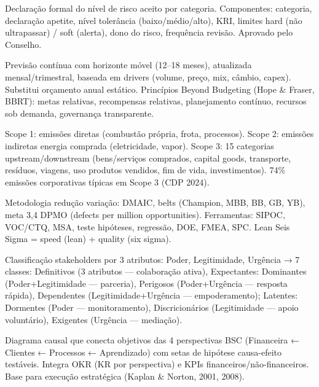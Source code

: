 \begin{ecglossario}
\item[\textbf{Risk Appetite Statement (RAS)}] Declaração formal do nível de risco aceito por categoria. Componentes: categoria, declaração apetite, nível tolerância (baixo/médio/alto), KRI, limites hard (não ultrapassar) / soft (alerta), dono do risco, frequência revisão. Aprovado pelo Conselho.

\item[\textbf{Rolling Forecast}] Previsão contínua com horizonte móvel (12–18 meses), atualizada mensal/trimestral, baseada em drivers (volume, preço, mix, câmbio, capex). Substitui orçamento anual estático. Princípios Beyond Budgeting (Hope \& Fraser, BBRT): metas relativas, recompensas relativas, planejamento contínuo, recursos sob demanda, governança transparente.

\item[\textbf{Scope 1, 2, 3 (GHG Protocol)}] Scope 1: emissões diretas (combustão própria, frota, processos). Scope 2: emissões indiretas energia comprada (eletricidade, vapor). Scope 3: 15 categorias upstream/downstream (bens/serviços comprados, capital goods, transporte, resíduos, viagens, uso produtos vendidos, fim de vida, investimentos). 74\% emissões corporativas típicas em Scope 3 (CDP 2024).

\item[\textbf{Seis Sigma}] Metodologia redução variação: DMAIC, belts (Champion, MBB, BB, GB, YB), meta 3,4 DPMO (defects per million opportunities). Ferramentas: SIPOC, VOC/CTQ, MSA, teste hipóteses, regressão, DOE, FMEA, SPC. Lean Seis Sigma = speed (lean) + quality (six sigma).

\item[\textbf{Stakeholder Salience (Mitchell, Agle \& Wood, 1997)}] Classificação stakeholders por 3 atributos: Poder, Legitimidade, Urgência → 7 classes: Definitivos (3 atributos — colaboração ativa), Expectantes: Dominantes (Poder+Legitimidade — parceria), Perigosos (Poder+Urgência — resposta rápida), Dependentes (Legitimidade+Urgência — empoderamento); Latentes: Dormentes (Poder — monitoramento), Discricionários (Legitimidade — apoio voluntário), Exigentes (Urgência — mediação).

\item[\textbf{Strategy Map (Mapa Estratégico)}] Diagrama causal que conecta objetivos das 4 perspectivas BSC (Financeira ← Clientes ← Processos ← Aprendizado) com setas de hipótese causa-efeito testáveis. Integra OKR (KR por perspectiva) e KPIs financeiros/não-financeiros. Base para execução estratégica (Kaplan \& Norton, 2001, 2008).


\end{ecglossario}

